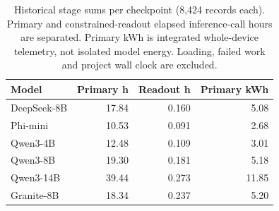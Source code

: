 \begin{table}[t]\caption{Historical stage sums per checkpoint (8,424 records each). Primary and constrained-readout elapsed inference-call hours are separated. Primary kWh is integrated whole-device telemetry, not isolated model energy. Loading, failed work and project wall clock are excluded.}\label{tab:resources}\centering\small
\begin{tabular}{lrrr}\toprule
Model & Primary h & Readout h & Primary kWh \\\midrule
DeepSeek-8B & 17.84 & 0.160 & 5.08 \\
Phi-mini & 10.53 & 0.091 & 2.68 \\
Qwen3-4B & 12.48 & 0.109 & 3.01 \\
Qwen3-8B & 19.30 & 0.181 & 5.18 \\
Qwen3-14B & 39.44 & 0.273 & 11.85 \\
Granite-8B & 18.34 & 0.237 & 5.20 \\
\bottomrule\end{tabular}\end{table}
